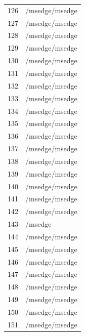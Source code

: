 \documentclass[a4paper,twoside,12pt]{book}
\begin{document}
\begin{appendices}
\begin{table}
\begin{tabular}{ll}
		126 &                                     /msedge/msedge \\
		127 &                                     /msedge/msedge \\
		128 &                                     /msedge/msedge \\
		129 &                                     /msedge/msedge \\
		130 &                                     /msedge/msedge \\
		131 &                                     /msedge/msedge \\
		132 &                                     /msedge/msedge \\
		133 &                                     /msedge/msedge \\
		134 &                                     /msedge/msedge \\
		135 &                                     /msedge/msedge \\
		136 &                                     /msedge/msedge \\
		137 &                                     /msedge/msedge \\
		138 &                                     /msedge/msedge \\
		139 &                                     /msedge/msedge \\
		140 &                                     /msedge/msedge \\
		141 &                                     /msedge/msedge \\
		142 &                                     /msedge/msedge \\
		143 &                                            /msedge \\
		144 &                                     /msedge/msedge \\
		145 &                                     /msedge/msedge \\
		146 &                                     /msedge/msedge \\
		147 &                                     /msedge/msedge \\
		148 &                                     /msedge/msedge \\
		149 &                                     /msedge/msedge \\
		150 &                                     /msedge/msedge \\
		151 &                                     /msedge/msedge \\

\end{tabular}
\end{table}
\end{appendices}
\end{document}
